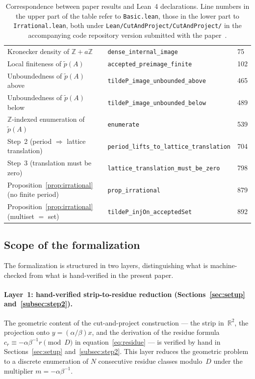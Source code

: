 \documentclass[11pt,reqno]{amsart}
\theoremstyle{plain}
\theoremstyle{definition}
\theoremstyle{remark}
\begin{document}
\begin{table}[ht]
\begin{tabular}{lll}
Kronecker density of \(\mathbb{Z}+a\mathbb{Z}\)
  & \texttt{dense\_internal\_image} & 75 \\
Local finiteness of \(\tilde p(A)\)
  & \texttt{accepted\_preimage\_finite} & 102 \\
Unboundedness of \(\tilde p(A)\) above
  & \texttt{tildeP\_image\_unbounded\_above} & 465 \\
Unboundedness of \(\tilde p(A)\) below
  & \texttt{tildeP\_image\_unbounded\_below} & 489 \\
\(\mathbb{Z}\)-indexed enumeration of \(\tilde p(A)\)
  & \texttt{enumerate} & 539 \\
Step~2 (period \(\Rightarrow\) lattice translation)
  & \texttt{period\_lifts\_to\_lattice\_translation} & 704 \\
Step~3 (translation must be zero)
  & \texttt{lattice\_translation\_must\_be\_zero} & 798 \\
Proposition~\ref{prop:irrational} (no finite period)
  & \texttt{prop\_irrational} & 879 \\
Proposition~\ref{prop:irrational} (multiset \(=\) set)
  & \texttt{tildeP\_injOn\_acceptedSet} & 892 \\
\hline
\end{tabular}
\caption{Correspondence between paper results and Lean~4 declarations.
Line numbers in the upper part of the table refer to
\texttt{Basic.lean}, those in the lower part to
\texttt{Irrational.lean}, both under
\texttt{Lean/\allowbreak CutAndProject/\allowbreak CutAndProject/} in the
accompanying code repository version submitted with the
paper~\cite{Kunert2026}.}
\label{tab:lean}
\end{table}

\subsection{Scope of the formalization}\label{subsec:lean_scope}

The formalization is structured in two layers, distinguishing what is
machine-checked from what is hand-verified in the present paper.

\paragraph{Layer~1: hand-verified strip-to-residue reduction
(Sections~\ref{sec:setup} and~\ref{subsec:step2}).} The geometric content
of the cut-and-project construction --- the strip in~\(\mathbb{R}^2\),
the projection onto \(y = (\alpha/\beta)x\), and the derivation of the
residue formula \(c_r \equiv -\alpha\beta^{-1}r \pmod{D}\) in
equation~\eqref{eq:residue} --- is verified by hand in
Sections~\ref{sec:setup} and~\ref{subsec:step2}.
This layer reduces the geometric problem to a discrete enumeration of
\(N\) consecutive residue classes modulo~\(D\) under the multiplier
\(m = -\alpha\beta^{-1}\).
\end{document}
